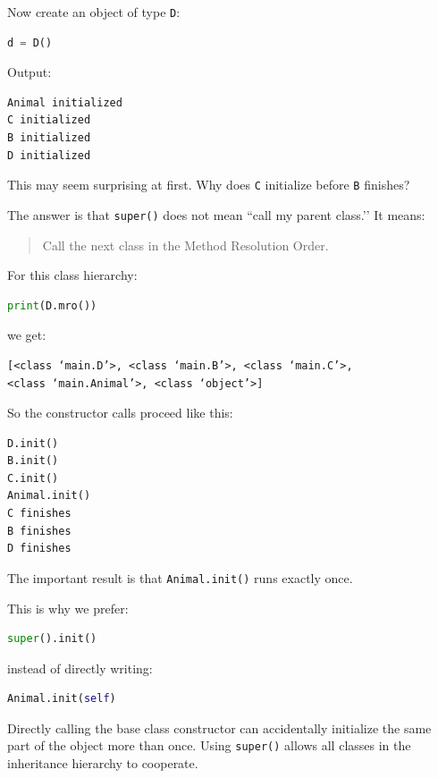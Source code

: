 \documentclass[11pt]{article}
\begin{document}
Now create an object of type \verb|D|:

\begin{lstlisting}[language=Python]
d = D()
\end{lstlisting}

Output:

\begin{verbatim}
Animal initialized
C initialized
B initialized
D initialized
\end{verbatim}

This may seem surprising at first. Why does \verb|C| initialize before \verb|B| finishes?

The answer is that \verb|super()| does not mean ``call my parent class.’’ It means:

\begin{quote}
Call the next class in the Method Resolution Order.
\end{quote}

For this class hierarchy:

\begin{lstlisting}[language=Python]
print(D.mro())
\end{lstlisting}

we get:

\begin{verbatim}
[<class ‘main.D’>, <class ‘main.B’>, <class ‘main.C’>,
<class ‘main.Animal’>, <class ‘object’>]
\end{verbatim}

So the constructor calls proceed like this:

\begin{verbatim}
D.init()
B.init()
C.init()
Animal.init()
C finishes
B finishes
D finishes
\end{verbatim}

The important result is that \verb|Animal.init()| runs exactly once.

This is why we prefer:

\begin{lstlisting}[language=Python]
super().init()
\end{lstlisting}

instead of directly writing:

\begin{lstlisting}[language=Python]
Animal.init(self)
\end{lstlisting}

Directly calling the base class constructor can accidentally initialize the same part of the object more than once. Using \verb|super()| allows all classes in the inheritance hierarchy to cooperate.
\end{document}
